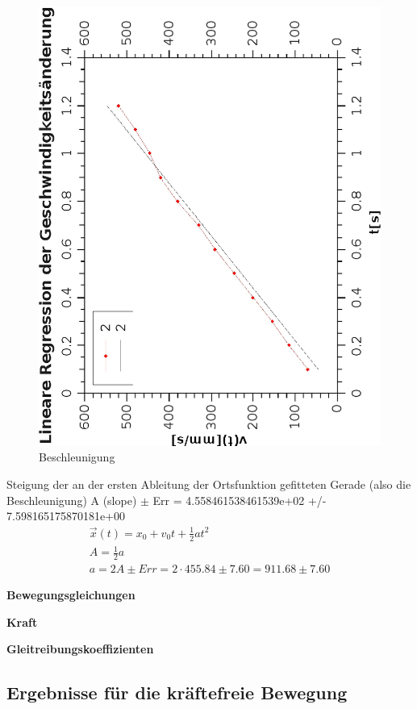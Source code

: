 \documentclass{article}
\begin{document}
\begin{figure}[H]
\caption{Beschleunigung}
\begin{center}
\includegraphics[scale=0.7,angle=-90]{GlmBeschlRegrBeschl.eps}
\end{center}
\end{figure}
Steigung der an der ersten Ableitung der Ortsfunktion gefitteten Gerade (also die Beschleunigung) 
A (slope) $\pm$ Err = 4.558461538461539e+02 +/- 7.598165175870181e+00
\begin{gather}
\vec{x}(t)=x_0+v_0t+\frac{1}{2}at^2 \\
A=\frac{1}{2}a \\
a=2A\pm Err=2\cdot 455.84 \pm 7.60=911.68\pm 7.60
\end{gather}

\textbf{Bewegungsgleichungen}

\textbf{Kraft}

\textbf{Gleitreibungskoeffizienten}


\subsection{Ergebnisse für die kräftefreie Bewegung}
\end{document}

